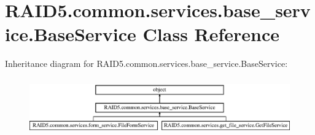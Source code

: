 \hypertarget{class_r_a_i_d5_1_1common_1_1services_1_1base__service_1_1_base_service}{}\section{R\+A\+I\+D5.\+common.\+services.\+base\+\_\+service.\+Base\+Service Class Reference}
\label{class_r_a_i_d5_1_1common_1_1services_1_1base__service_1_1_base_service}
Inheritance diagram for R\+A\+I\+D5.\+common.\+services.\+base\+\_\+service.\+Base\+Service\+:\begin{figure}[H]
\begin{center}
\leavevmode
\includegraphics[height=2.470588cm]{class_r_a_i_d5_1_1common_1_1services_1_1base__service_1_1_base_service}
\end{center}
\end{figure}
